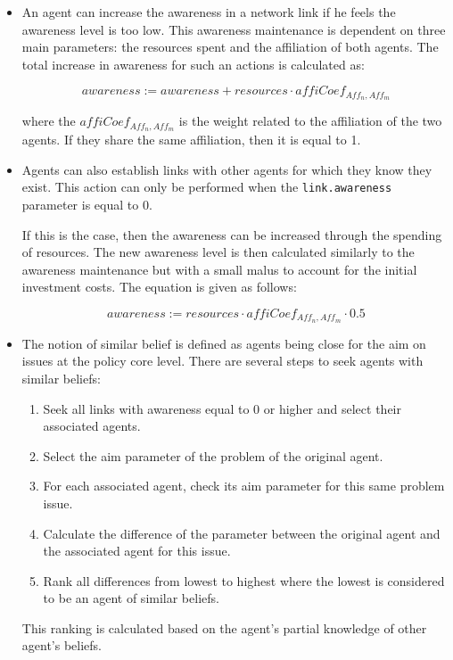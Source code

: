 \begin{itemize}
\item An agent can increase the awareness in a network link if he feels the awareness level is too low. This awareness maintenance is dependent on three main parameters: the resources spent and the affiliation of both agents. The total increase in awareness for such an actions is calculated as:

\begin{equation}
awareness := awareness + resources \cdot affiCoef_{Aff_n,Aff_m}
\end{equation}

where the $affiCoef_{Aff_n,Aff_m}$ is the weight related to the affiliation of the two agents. If they share the same affiliation, then it is equal to 1.

\item Agents can also establish links with other agents for which they know they exist. This action can only be performed when the \texttt{link.awareness} parameter is equal to 0.

If this is the case, then the awareness can be increased through the spending of resources. The new awareness level is then calculated similarly to the awareness maintenance but with a small malus to account for the initial investment costs. The equation is given as follows:

\begin{equation}
awareness := resources \cdot affiCoef_{Aff_n,Aff_m} \cdot 0.5
\end{equation}

\item The notion of similar belief is defined as agents being close for the aim on issues at the policy core level. There are several steps to seek agents with similar beliefs:

\begin{enumerate}
\item Seek all links with awareness equal to 0 or higher and select their associated agents.
\item Select the aim parameter of the problem of the original agent.
\item For each associated agent, check its aim parameter for this same problem issue.
\item Calculate the difference of the parameter between the original agent and the associated agent for this issue.
\item Rank all differences from lowest to highest where the lowest is considered to be an agent of similar beliefs.
\end{enumerate}

This ranking is calculated based on the agent’s partial knowledge of other agent’s beliefs.
\end{itemize}

